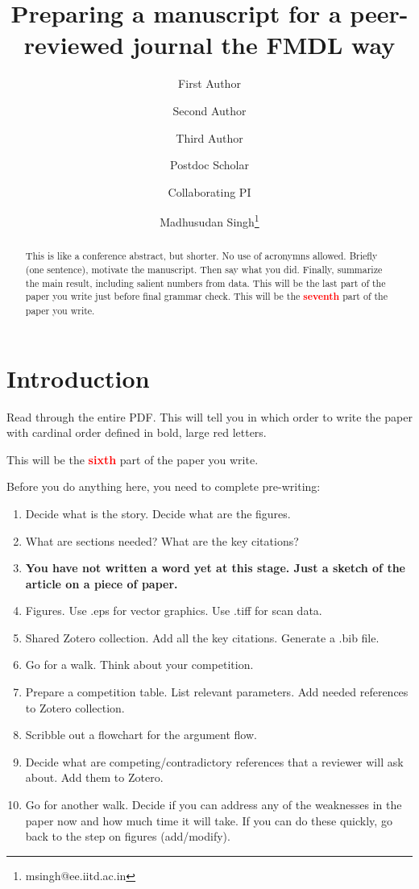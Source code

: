 \documentclass[12 pt]{article}
\title{Preparing a manuscript for a peer-reviewed journal the FMDL way}
\author[1]{\small First Author}
\author[2]{\small Second Author}
\author[1]{\small Third Author}
\author[1]{\small Postdoc Scholar}
\author[2]{\small Collaborating PI}
\author[1]{\small Madhusudan Singh\thanks{msingh@ee.iitd.ac.in}}
\affil[1]{\footnotesize Functional Materials \& Devices Laboratory, Department of Electrical Engineering, IIT Delhi, New Delhi, NCT, India, 110 016.}
\affil[2]{\footnotesize Department of Chemistry, IIT Delhi, New Delhi, NCT, India, 110 016.}
\date{}
\begin{document}
\maketitle
\begin{abstract}
This is like a conference abstract, but shorter. No use of acronymns allowed. Briefly (one sentence), motivate the manuscript. Then say what you did. Finally, summarize the main result, including salient numbers from data. This will be the last part of the paper you write just before final grammar check. This will be the \textbf{\Huge \textcolor{red}{seventh}} part of the paper you write.
\end{abstract}

\section{Introduction}
\label{sec:introduction}

Read through the entire PDF. This will tell you in which order to write the paper with cardinal order defined in bold, large red letters.

This will be the \textbf{\Huge \textcolor{red}{sixth}} part of the paper you write.

Before you do anything here, you need to complete pre-writing:

\begin{enumerate}
\item Decide what is the story. Decide what are the figures.
\item What are sections needed? What are the key citations?
\item \textbf{You have not written a word yet at this stage. Just a sketch of the article on a piece of paper.}
\item Figures. Use .eps for vector graphics. Use .tiff for scan data.
\item Shared Zotero collection. Add all the key citations. Generate a .bib file.
\item Go for a walk. Think about your competition.
\item Prepare a competition table. List relevant parameters. Add needed references to Zotero collection.
\item Scribble out a flowchart for the argument flow.
\item Decide what are competing/contradictory references that a reviewer will ask about. Add them to Zotero.
\item Go for another walk. Decide if you can address any of the weaknesses in the paper now and how much time it will take. If you can do these quickly, go back to the step on figures (add/modify).
\end{enumerate}
\end{document}

